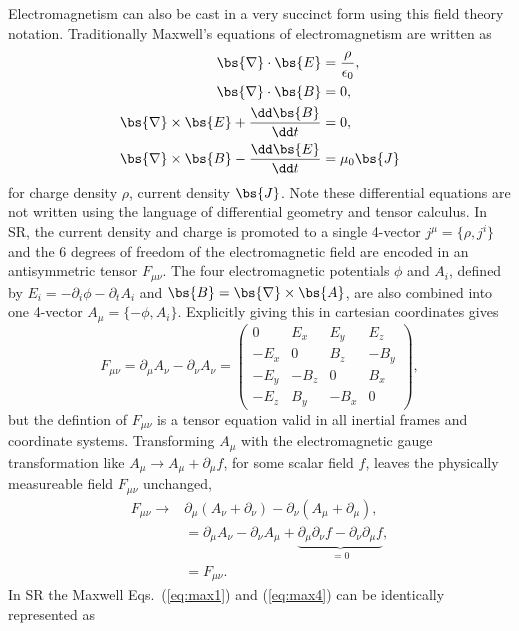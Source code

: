 Electromagnetism can also be cast in a very succinct form using this field theory notation. Traditionally Maxwell's equations of electromagnetism are written as
\begin{align}
\bs{\nabla} \cdot \bs{E} &= \frac{\rho}{\epsilon_0} ,\label{eq:max1}\\
\bs{\nabla} \cdot \bs{B} &= 0 ,\label{eq:max2}\\
\bs{\nabla} \times \bs{E}  + \frac{\dd \bs{B}}{\dd t} &=0,\label{eq:max3}\\
\bs{\nabla} \times \bs{B} -\frac{\dd \bs{E}}{\dd t} &= \mu_0 \bs{J}\label{eq:max4}
\end{align}
for charge density $\rho$, current density $\bs{J}$. Note these differential equations are not written using the language of differential geometry and tensor calculus. In SR, the current density and charge is promoted to a single 4-vector $j^\mu = \{\rho,j^i\}$ and the 6 degrees of freedom of the electromagnetic field are encoded in an antisymmetric tensor $F_{\mu\nu}$. The four electromagnetic potentials $\phi$ and $A_i$, defined by $E_i = -\partial_i \phi - \partial_t A_i$ and $\bs{B} = \bs{\nabla}\times \bs{A}$, are also combined into one 4-vector $A_\mu = \{-\phi,A_i\}$. Explicitly giving this in cartesian coordinates gives
\begin{equation}
F_{\mu\nu} = \partial_\mu A_\nu - \partial_\nu A_\nu = \begin{pmatrix} 0 & E_x & E_y & E_z \\  -E_x & 0 & B_z & -B_y \\  -E_y & -B_z & 0 & B_x \\  -E_z & B_y & -B_x & 0 \end{pmatrix},
\end{equation}
but the defintion of $F_{\mu\nu}$ is a tensor equation valid in all inertial frames and coordinate systems. Transforming $A_\mu$ with the electromagnetic gauge transformation like $A_\mu \rightarrow A_\mu + \partial_\mu f$, for some scalar field $f$, leaves the physically measureable field $F_{\mu\nu}$ unchanged,
\begin{align}
F_{\mu\nu} \rightarrow &\partial_{\mu} (A_\nu + \partial_\nu) -  \partial_{\nu} (A_\mu + \partial_\mu) ,\\
&= \partial_{\mu} A_\nu - \partial_{\nu} A_\mu + \underbrace{\partial_\mu\partial_\nu f - \partial_\nu \partial_\mu f}_{=0} , \\
&= F_{\mu\nu}.
\end{align}
In SR the Maxwell Eqs.~(\ref{eq:max1}) and (\ref{eq:max4}) can be identically represented as
